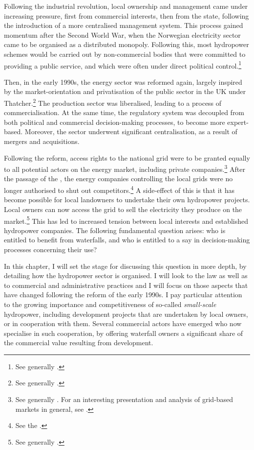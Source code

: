 Following the industrial revolution, local ownership and management came under increasing pressure, first from commercial interests, then from the state, following the introduction of a more centralised management system. This process gained momentum after the Second World War, when the Norwegian electricity sector came to be organised as a distributed monopoly. Following this, most hydropower schemes would be carried out by non-commercial bodies that were committed to providing a public service, and which were often under direct political control.\footnote{See generally \cite{skjold06}.} 

Then, in the early 1990s, the energy sector was reformed again, largely inspired by the market-orientation and privatisation of the public sector in the UK under Thatcher.\footnote{See generally \cite{midttun98}.} The production sector was liberalised, leading to a process of commercialisation. At the same time, the regulatory system was decoupled from both political and commercial decision-making processes, to become more expert-based. Moreover, the sector underwent significant centralisation, as a result of mergers and acquisitions.

Following the reform, access rights to the national grid were to be granted equally to all potential actors on the energy market, including private companies.\footnote{See generally \cite{hammer96}. For an interesting presentation and analysis of grid-based markets in general, see \cite{falch04}.} After the passage of the \cite{ea90}, the energy companies controlling the local grids were no longer authorised to shut out competitors.\footnote{See the \cite[3-4]{ea90}.} A side-effect of this is that it has become possible for local landowners to undertake their own hydropower projects. Local owners can now access the grid to sell the electricity they produce on the market.\footnote{See generally \cite{larsen06,larsen08,larsen12}.} This has led to increased tension between local interests and established hydropower companies. The following fundamental question arises: who is entitled to benefit from waterfalls, and who is entitled to a say in decision-making processes concerning their use?

In this chapter, I will set the stage for discussing this question in more depth, by detailing how the hydropower sector is organised. I will look to the law as well as to commercial and administrative practices and I will focus on those aspects that have changed following the reform of the early 1990s. I pay particular attention to the growing importance and competitiveness of so-called {\it small-scale} hydropower, including development projects that are undertaken by local owners, or in cooperation with them. Several commercial actors have emerged who now specialise in such cooperation, by offering waterfall owners a significant share of the commercial value resulting from development. 

